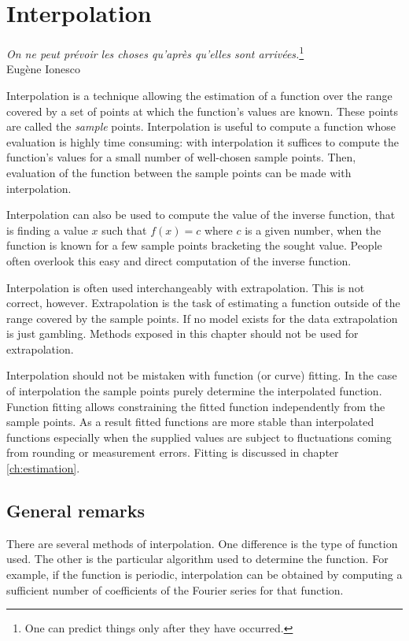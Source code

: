 \documentclass[twoside]{book}
\begin{document}
\fi

\chapter{Interpolation}
\label{ch:interpolation}
\begin{flushright}
{\sl On ne peut pr\'evoir les choses qu'apr\`es qu'elles sont
arriv\'ees.}\footnote{One can predict things only after they have
occurred.}\\ Eug\`ene Ionesco
\end{flushright}
\vspace{1 ex} Interpolation is a technique allowing the estimation
of a function over the range covered by a set of points at which
the function's values are known. These points are called the {\sl
sample} points. Interpolation is useful to compute a function
whose evaluation is highly time consuming: with interpolation it
suffices to compute the function's values for a small number of
well-chosen sample points. Then, evaluation of the function
between the sample points can be made with interpolation.

Interpolation can also be used to compute the value of the inverse
function, that is finding a value $x$ such that
$f\left(x\right)=c$ where $c$ is a given number, when the function
is known for a few sample points bracketing the sought value.
People often overlook this easy and direct computation of the
inverse function.

Interpolation is often used interchangeably with extrapolation.
This is not correct, however. Extrapolation is the task of
estimating a function outside of the range covered by the sample
points. If no model exists for the data extrapolation is just
gambling. Methods exposed in this chapter should not be used for
extrapolation.

Interpolation should not be mistaken with function (or curve)
fitting. In the case of interpolation the sample points purely
determine the interpolated function. Function fitting allows
constraining the fitted function independently from the sample
points. As a result fitted functions are more stable than
interpolated functions especially when the supplied values are
subject to fluctuations coming from rounding or measurement
errors. Fitting is discussed in chapter \ref{ch:estimation}.

\section{General remarks}
\label{sec:interpolgen} There are several methods of
interpolation. One difference is the type of function used. The
other is the particular algorithm used to determine the function.
For example, if the function is periodic, interpolation can be
obtained by computing a sufficient number of coefficients of the
Fourier series for that function.
\end{document}
